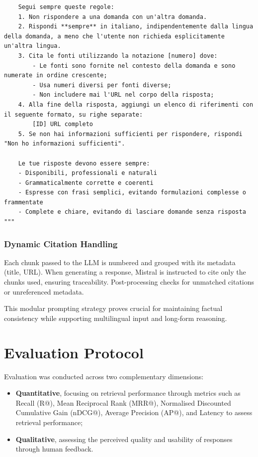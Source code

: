 \begin{spacing}{1.5}
\begin{lstlisting}
    Segui sempre queste regole:
    1. Non rispondere a una domanda con un'altra domanda.
    2. Rispondi **sempre** in italiano, indipendentemente dalla lingua della domanda, a meno che l'utente non richieda esplicitamente un'altra lingua.
    3. Cita le fonti utilizzando la notazione [numero] dove:
        - Le fonti sono fornite nel contesto della domanda e sono numerate in ordine crescente;
        - Usa numeri diversi per fonti diverse;
        - Non includere mai l'URL nel corpo della risposta;
    4. Alla fine della risposta, aggiungi un elenco di riferimenti con il seguente formato, su righe separate:
        [ID] URL completo
    5. Se non hai informazioni sufficienti per rispondere, rispondi "Non ho informazioni sufficienti".

    Le tue risposte devono essere sempre:
    - Disponibili, professionali e naturali
    - Grammaticalmente corrette e coerenti
    - Espresse con frasi semplici, evitando formulazioni complesse o frammentate
    - Complete e chiare, evitando di lasciare domande senza risposta
"""
\end{lstlisting}
\vspace{0.5em}


\noindent\subsubsection*{\large Dynamic Citation Handling}

Each chunk passed to the LLM is numbered and grouped with its metadata (title, URL). When generating a response, Mistral is instructed to cite only the chunks used, ensuring traceability. Post-processing checks for unmatched citations or unreferenced metadata.

This modular prompting strategy proves crucial for maintaining factual consistency while supporting multilingual input and long-form reasoning.


\section{Evaluation Protocol}\label{sec:evaluation_protocol}
Evaluation was conducted across two complementary dimensions: 
\begin{itemize}
      \item \textbf{Quantitative}, focusing on retrieval performance through metrics such as Recall (R@), Mean Reciprocal Rank (MRR@), Normalised Discounted Cumulative Gain (nDCG@), Average Precision (AP@), and Latency to assess retrieval performance;
      \item \textbf{Qualitative}, assessing the perceived quality and usability of responses through human feedback.
\end{itemize}


\end{spacing}
